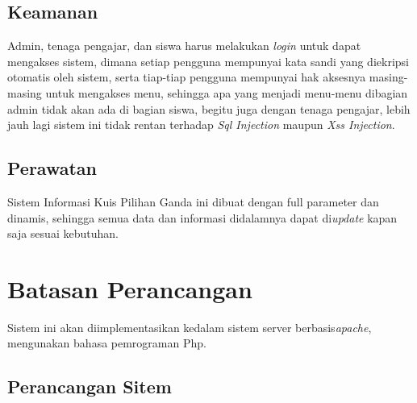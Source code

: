 \documentclass{scrreprt}
\begin{document}
	\subsection{Keamanan}
	Admin, tenaga pengajar, dan siswa harus melakukan \emph{login} untuk dapat mengakses sistem, dimana setiap pengguna mempunyai kata sandi yang diekripsi otomatis oleh sistem, serta tiap-tiap pengguna mempunyai hak aksesnya masing-masing untuk mengakses menu, sehingga apa yang menjadi menu-menu dibagian admin tidak akan ada di bagian siswa, begitu juga dengan tenaga pengajar, lebih jauh lagi sistem ini tidak rentan terhadap \emph{Sql Injection} maupun \emph{Xss Injection}. 
	
	\subsection{Perawatan}
	Sistem Informasi Kuis Pilihan Ganda ini dibuat dengan full parameter dan dinamis, sehingga semua data dan informasi didalamnya dapat di\emph{update} kapan saja sesuai kebutuhan.
	
	
\section{Batasan Perancangan}
Sistem ini akan diimplementasikan kedalam sistem server berbasis\emph{apache}, mengunakan bahasa pemrograman Php.
	
	\subsection{Perancangan Sitem}
	
\end{document}
